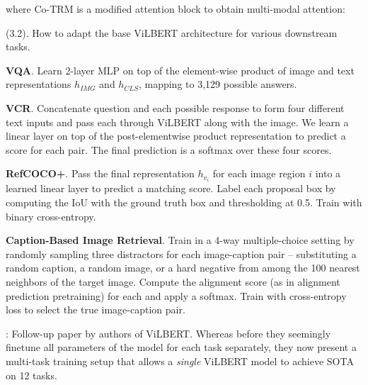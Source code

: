 \documentclass[11pt]{article}
\begin{document}
where Co-TRM is a modified attention block to obtain multi-modal attention:



 (3.2). How to adapt the base ViLBERT architecture for various downstream tasks.
\begin{compactitem}
	\item \textbf{VQA}. Learn 2-layer MLP on top of the element-wise product of image and text representations $h_{IMG}$ and $h_{CLS}$, mapping to 3,129 possible answers.
	
	\item \textbf{VCR}. Concatenate question and each possible response to form four different text inputs and pass each through ViLBERT along with the image. We learn a linear layer on top of the post-elementwise product representation to predict a score for each pair. The final prediction is a softmax over these four scores.
	
	\item \textbf{RefCOCO+}. Pass the final representation $h_{v_i}$ for each image region $i$ into a learned linear layer to predict a matching score. Label each proposal box by computing the IoU with the ground truth box and thresholding at 0.5. Train with binary cross-entropy.
	
	\item \textbf{Caption-Based Image Retrieval}. Train in a 4-way multiple-choice setting by randomly sampling three distractors for each image-caption pair -- substituting a random caption, a random image, or a hard negative from among the 100 nearest neighbors of the target image. Compute the alignment score (as in alignment prediction pretraining) for each and apply a softmax. Train with cross-entropy loss to select the true image-caption pair.
\end{compactitem}




\myspace
{}
\myspace


: Follow-up paper by authors of ViLBERT. Whereas before they seemingly finetune all parameters of the model for each task separately, they now present a multi-task training setup that allows a \textit{single} ViLBERT model to achieve SOTA on 12 tasks. 
\end{document}
